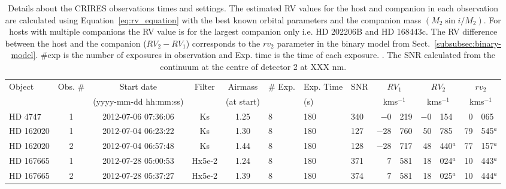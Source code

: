 
\begin{table*}
           \centering    
            \caption{Details about the CRIRES observations times and settings. {\rd The estimated RV values for the host and companion in each observation are calculated using Equation~\ref{eq:rv_equation} with the best known orbital parameters and the companion mass \((M_{2}\sin{i}/M_{2})\)}. For hosts with multiple companions the RV value is for the largest companion only i.e. {HD 202206}B and {HD 168443}c. The RV difference between the host and the companion (\(RV_2 - RV_1\)) corresponds to the \(rv_2\) parameter in the binary model from Sect.~\ref{subsubsec:binary-model}. {\rd \#exp is the number of exposures in observation and Exp. time is the time of each exposure. . The SNR calculated from the continuum at the centre of detector 2 at XXX nm.}}
            \begin{tabular}{l c c c clll r@{.}l r@{.}l r@{.}l}
                \toprule
                Object & Obs. \# & Start date  & Filter & Airmass  & \# Exp. & Exp. Time & SNR & \multicolumn{2}{c}{\(RV_1\)} & \multicolumn{2}{c}{\(RV_2\)} & \multicolumn{2}{c}{\(rv_2\)}  \\  %
                &   & (yyyy-mm-dd hh:mm:ss)  &  & (at start) & & (s) & & \multicolumn{2}{c}{kms\(^{-1}\)} & \multicolumn{2}{c}{kms\(^{-1}\)} & \multicolumn{2}{c}{kms\(^{-1}\)}\\ %
                \midrule
                {HD 4747}   & 1 & 2012-07-06 07:36:06 & Ks     	      & 1.25  	  &8 &180 & 340 & $-$0    & 219 & $-$0  & 154 & 0&065 \\ %
                {HD 162020} & 1 & 2012-07-04 06:23:22 & Ks     		& 1.30 		& 8&180 & 127 & $-$28  & 760 & 50 & 785\tnote{a}  & 79&545$^a$ \\ %
                {HD 162020} & 2 & 2012-07-04 06:57:48 & Ks     		& 1.44  	& 8&180 & 128 & $-$28  & 717 & 48 & 440$^a$ & 77&157$^a$ \\ %
                {HD 167665} & 1 & 2012-07-28 05:00:53 & Hx5e-2 	& 1.24 		& 8&180 & 371 & 7         & 581 & 18 & 024$^a$ & 10&443$^a$ \\ %
                {HD 167665} & 2 & 2012-07-28 05:37:27 & Hx5e-2 	& 1.39  	&8 &180 & 374 & 7         & 581 & 18 & 025$^a$  & 10&444$^a$ \\ %

\end{tabular}
\end{table*}
